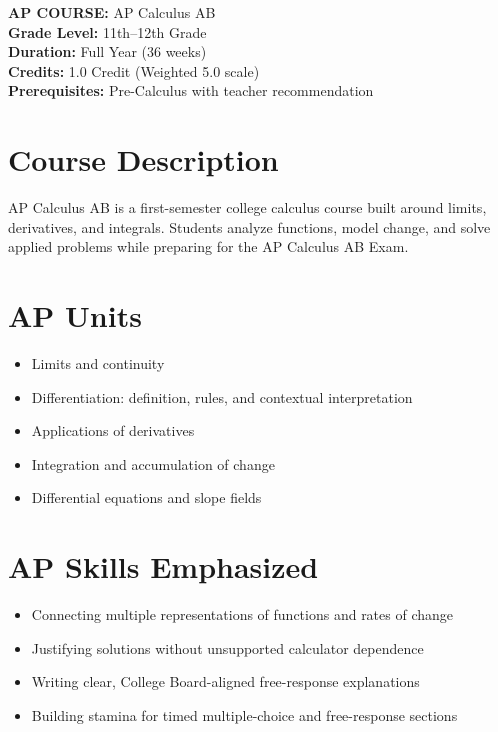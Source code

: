 \documentclass[12pt,oneside]{book}
\begin{document}
\noindent\textbf{AP COURSE:} AP Calculus AB\\
\textbf{Grade Level:} 11th--12th Grade\\
\textbf{Duration:} Full Year (36 weeks)\\
\textbf{Credits:} 1.0 Credit (Weighted 5.0 scale)\\
\textbf{Prerequisites:} Pre-Calculus with teacher recommendation

\section{Course Description}
AP Calculus AB is a first-semester college calculus course built around limits, derivatives, and integrals.
Students analyze functions, model change, and solve applied problems while preparing for the AP Calculus AB
Exam.

\section{AP Units}
\begin{itemize}[leftmargin=2em]
    \item Limits and continuity
    \item Differentiation: definition, rules, and contextual interpretation
    \item Applications of derivatives
    \item Integration and accumulation of change
    \item Differential equations and slope fields
\end{itemize}

\section{AP Skills Emphasized}
\begin{itemize}[leftmargin=2em]
    \item Connecting multiple representations of functions and rates of change
    \item Justifying solutions without unsupported calculator dependence
    \item Writing clear, College Board-aligned free-response explanations
    \item Building stamina for timed multiple-choice and free-response sections
\end{itemize}
\end{document}
